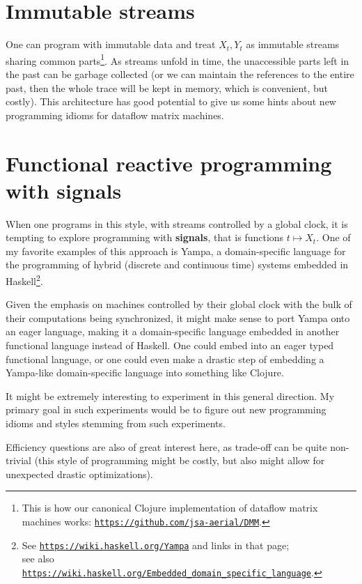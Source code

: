 \documentclass{article}
\begin{document}
\section{Immutable streams}

One can program with immutable data and treat $X_{t}, Y_{t}$ as immutable streams sharing common parts\footnote{This is how
our canonical Clojure implementation of dataflow matrix machines works:
\href{https://github.com/jsa-aerial/DMM}{\tt https://github.com/jsa-aerial/DMM}.}. As streams unfold in time,
the unaccessible parts left in the past can be garbage collected (or we can maintain the references to the
entire past, then the whole trace will be kept in memory, which is convenient, but costly). This architecture
has good potential to give us some hints about new programming idioms for dataflow matrix machines.

\section{Functional reactive programming with signals}

When one programs in this style, with streams controlled by a global clock, it is tempting to explore programming
with {\bf signals}, that is functions $t \mapsto X_t$. One of my favorite examples of this approach is
Yampa, a domain-specific language for the programming of hybrid (discrete and continuous time) systems embedded in 
Haskell\footnote{See \href{https://wiki.haskell.org/Yampa}{\tt https://wiki.haskell.org/Yampa} and links in that page;\\ see also
\href{https://wiki.haskell.org/Embedded_domain_specific_language}{\tt https://wiki.haskell.org/Embedded\_domain\_specific\_language}.}.

Given the emphasis on machines controlled by their global clock with the bulk of their computations being synchronized,
it might make sense to port Yampa onto an eager language, making it a domain-specific language embedded in another
functional language instead of Haskell. One could embed into an eager typed functional language, or one could even
make a drastic step of embedding a Yampa-like domain-specific language into something like Clojure.

It might be extremely interesting to experiment in this general direction. My primary goal in such experiments would be
to figure out new programming idioms and styles stemming from such experiments.

Efficiency questions are also of great interest here, as trade-off can be quite non-trivial (this style of programming might
be costly, but also might allow for unexpected drastic optimizations).
\end{document}
